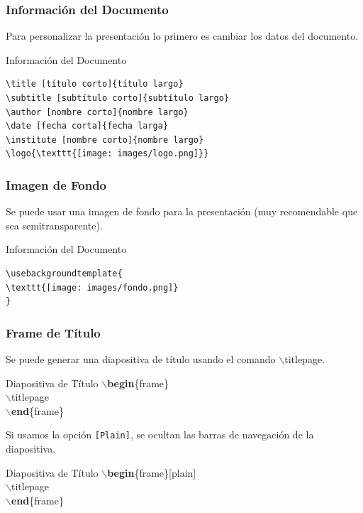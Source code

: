 \documentclass[aspectratio=43]{beamer}%
\begin{document}
\begin{frame}[fragile]
\frametitle{\textbf{Información del Documento}}
\justifying
 Para personalizar la presentación lo primero es cambiar los datos del documento.
 
\begin{exampleblock}{Información del Documento}

   \lstset{language=TEX}%
   \vspace{-0.7cm}
\begin{lstlisting}
\title [título corto]{título largo}
\subtitle [subtítulo corto]{subtítulo largo}
\author [nombre corto]{nombre largo}
\date [fecha corta]{fecha larga}
\institute [nombre corto]{nombre largo}
\logo{\texttt{[image: images/logo.png]}}
\end{lstlisting}\vspace{-0.3cm}
\end{exampleblock}
\end{frame}

\begin{frame}[fragile]
\frametitle{\textbf{Imagen de Fondo}}
\justifying

Se puede usar una imagen de fondo para la presentación (muy recomendable que sea semitransparente).

\begin{exampleblock}{Información del Documento}
   \lstset{language=TEX}%
   \vspace{-0.7cm}
\begin{lstlisting}
\usebackgroundtemplate{
\texttt{[image: images/fondo.png]}
}
\end{lstlisting}\vspace{-0.3cm}

\end{exampleblock}
\end{frame}

\begin{frame}[fragile]
\frametitle{\textbf{Frame de Título}}
\justifying
 Se puede generar una diapositiva de título usando el comando $\backslash$titlepage.
 \begin{exampleblock}{Diapositiva de Título}
$\backslash$\textbf{begin}\{frame\}\\
$\backslash$titlepage\\
$\backslash$\textbf{end}\{frame\}\\

\end{exampleblock}

Si usamos la opción \texttt{[Plain]}, se ocultan las barras de navegación de la diapositiva.

 \begin{exampleblock}{Diapositiva de Título}
$\backslash$\textbf{begin}\{frame\}[plain]\\
$\backslash$titlepage\\
$\backslash$\textbf{end}\{frame\}\\
\end{exampleblock}
\end{frame}
\end{document}
